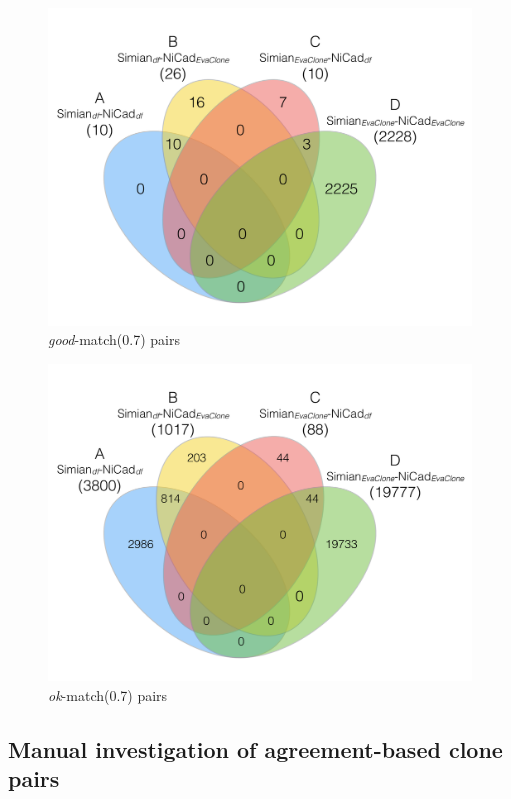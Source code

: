 \documentclass{sig-alternate-05-2015}
\begin{document}
\begin{figure}
		\centering
		\includegraphics[width=0.9\linewidth]{venn4_pairs_good_pt1+2}
		\caption{\textit{good}-match(0.7) pairs}
		\label{fig:venn4_orig_good}
\end{figure}

\begin{figure}
		\centering
		\includegraphics[width=0.9\linewidth]{venn4_pairs_ok_pt1+2}
		\caption{\textit{ok}-match(0.7) pairs}
		\label{fig:venn4_orig_ok}
\end{figure}

\subsection{Manual investigation of agreement-based clone pairs}
\end{document}
